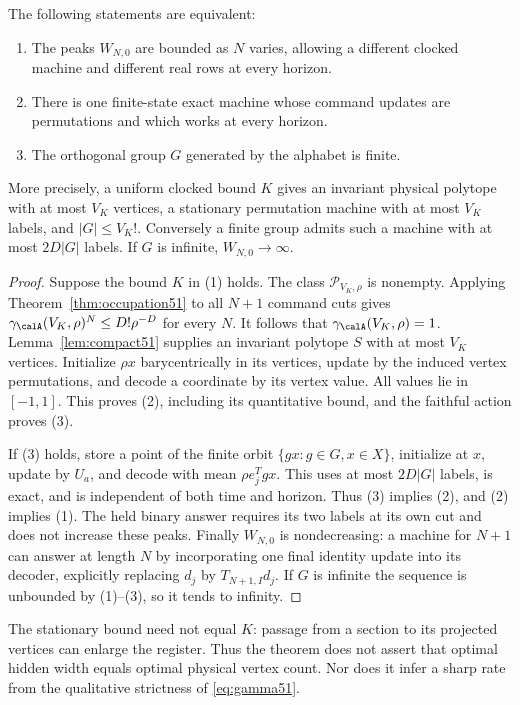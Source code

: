 \begin{theorem}
\label{thm:finitegroup51}
The following statements are equivalent:
\begin{enumerate}
\item The peaks $W_{N,0}$ are bounded as $N$ varies, allowing a different
clocked machine and different real rows at every horizon.
\item There is one finite-state exact machine whose command updates
are permutations and which works at every horizon.
\item The orthogonal group $G$ generated by the alphabet is finite.
\end{enumerate}
More precisely, a uniform clocked bound $K$ gives an invariant physical
polytope with at most $V_K$ vertices, a stationary permutation machine
with at most $V_K$ labels, and $|G|\le V_K!$. Conversely a finite
group admits such a machine with at most $2D|G|$ labels. If $G$ is
infinite, $W_{N,0}\to\infty$.
\end{theorem}
\begin{proof}
Suppose the bound $K$ in (1) holds. The class
$\mathscr P_{V_K,\rho}$ is nonempty. Applying
Theorem~\ref{thm:occupation51} to all $N+1$ command cuts gives
$\gamma_{\calA}(V_K,\rho)^N\le D!\rho^{-D}$ for every $N$.
It follows that $\gamma_{\calA}(V_K,\rho)=1$.
Lemma~\ref{lem:compact51} supplies an invariant polytope $S$ with at
most $V_K$ vertices. Initialize $\rho x$ barycentrically in its
vertices, update by the induced vertex permutations, and decode a
coordinate by its vertex value. All values lie in $[-1,1]$.
This proves (2), including its quantitative bound, and the faithful
action proves (3).

If (3) holds, store a point of the finite orbit
$\{gx:g\in G,x\in X\}$, initialize at $x$, update by $U_a$, and
decode with mean $\rho e_j^Tgx$. This uses at most $2D|G|$ labels,
is exact, and is independent of both time and horizon. Thus (3)
implies (2), and (2) implies (1). The held binary answer requires its
two labels at its own cut and does not increase these peaks.
Finally $W_{N,0}$ is nondecreasing: a machine for $N+1$ can answer
at length $N$ by incorporating one final identity update into its
decoder, explicitly replacing $d_j$ by $T_{N+1,I}d_j$.
If $G$ is infinite the sequence is unbounded by (1)--(3),
so it tends to infinity.
\end{proof}

The stationary bound need not equal $K$: passage from a section to
its projected vertices can enlarge the register. Thus the theorem
does not assert that optimal hidden width equals optimal physical
vertex count. Nor does it infer a sharp rate from the qualitative
strictness of \eqref{eq:gamma51}.

